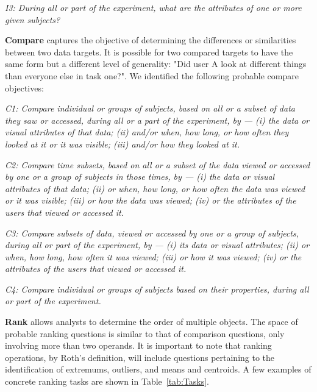\vspace{2mm}
\hangindent=3mm\textit{I3: During all or part of the experiment, what are the attributes of one or more given subjects?} 


\vspace{2mm}
\noindent\textbf{Compare} captures the objective of determining the differences or similarities between two data targets. It is possible for two compared targets to have the same form but a different level of generality: "Did user A look at different things than everyone else in task one?". We identified the following probable compare objectives: 

\vspace{2mm}
\hangindent=3mm\textit{C1: Compare individual or groups of subjects, based on all or a subset of data they saw or accessed, during all or a part of the experiment, by --- (i) the data or visual attributes of that data; (ii) and/or when, how long, or how often they looked at it or it was visible; (iii) and/or how they looked at it.}

\vspace{2mm}
\hangindent=3mm\textit{C2: Compare time subsets, based  on all or a subset of the data viewed or accessed by one or a group of subjects in those times, by --- (i) the data or visual attributes of that data; (ii) or when, how long, or how often the data was viewed or it was visible; (iii) or how the data was viewed; (iv) or the attributes of the users that viewed or accessed it.}

\vspace{2mm}
\hangindent=3mm\textit{C3: Compare subsets of data, viewed or accessed by one or a group of subjects, during all or part of the experiment, by --- (i) its data or visual attributes; (ii) or when, how long, how often it was viewed; (iii) or how it was viewed; (iv) or the attributes of the users that viewed or accessed it.}
	
\vspace{2mm}
\hangindent=3mm\textit{C4: Compare individual or groups of subjects based on their properties, during all or part of the experiment.}

\vspace{2mm}
\noindent\textbf{Rank} allows analysts to determine the order of multiple objects. The space of probable ranking questions is similar to that of comparison questions, only involving more than two operands. It is important to note that ranking operations, by Roth's definition, will include questions pertaining to the identification of extremums, outliers, and means and centroids. A few examples of concrete ranking tasks are shown in Table~\ref{tab:Tasks}. 



